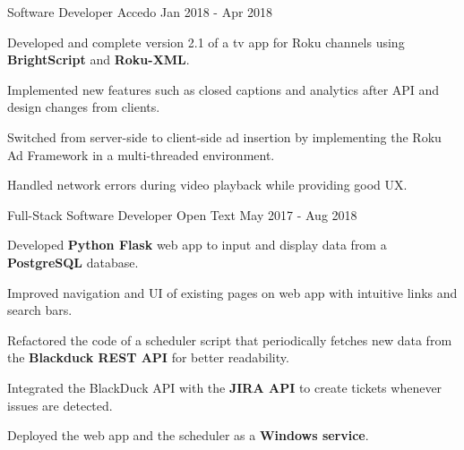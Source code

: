 

\begin{cventries}

  \cventry
    {Software Developer} %
    {Accedo} %
    {} %
    {Jan 2018 - Apr 2018} %
    {
      \begin{cvitems} %
        \item {Developed and complete version 2.1 of a tv app for Roku channels using \textbf{BrightScript} and \textbf{Roku-XML}.}
        \item {Implemented new features such as closed captions and analytics after API and design changes from clients.}
        \item {Switched from server-side to client-side ad insertion by implementing the Roku Ad Framework in a multi-threaded environment.}
        \item {Handled network errors during video playback while providing good UX.}
      \end{cvitems}
    }

  \cventry
    {Full-Stack Software Developer} %
    {Open Text} %
    {} %
    {May 2017 - Aug 2018} %
    {
      \begin{cvitems} %
        \item {Developed \textbf{Python Flask} web app to input and display data from a \textbf{PostgreSQL} database.}
        \item {Improved navigation and UI of existing pages on web app with intuitive links and search bars.}
        \item {Refactored the code of a scheduler script that periodically fetches new data from the \textbf{Blackduck REST API} for better readability.}
        \item {Integrated the BlackDuck API with the \textbf{JIRA API} to create tickets whenever issues are detected.}
        \item {Deployed the web app and the scheduler as a \textbf{Windows service}.}
      \end{cvitems}
    }

\end{cventries}
